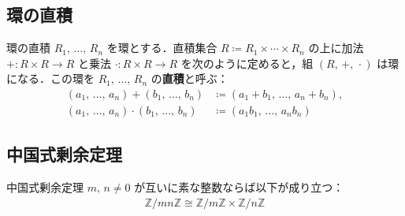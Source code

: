 \documentclass[geometry_main]{subfiles}
\begin{document}
\subsection{環の直積}

\begin{mydef}[label=def:prod-ring]{環の直積}
	$R_1,\, \dots ,\, R_n$ を環とする．直積集合 $R \coloneqq R_1 \times \cdots \times R_n$ の上に加法 $+ \colon R \times R \to R$ と乗法 $\cdot\mathrel{}\colon R\times R \to R$ を次のように定めると，組 $(R,\, +,\, \cdot\mathrel{})$ は環になる．この環を $R_1,\, \dots,\, R_n$ の\textbf{直積}と呼ぶ：
	\begin{align}
		(a_1,\, \dots ,\, a_n) + (b_1,\, \dots,\, b_n)& \coloneqq (a_1 + b_1 ,\, \dots ,\, a_n+b_n), \\
		(a_1,\, \dots ,\, a_n) \cdot (b_1,\, \dots,\, b_n)& \coloneqq (a_1b_1 ,\, \dots ,\, a_nb_n)
	\end{align}
\end{mydef}

\subsection{中国式剰余定理}

\begin{mytheo}[label=thm:ChineseRemainder]{中国式剰余定理}
	$m,\, n \neq 0$ が互いに素な整数ならば以下が成り立つ：
	\begin{align}
		\mathbb{Z}/mn\mathbb{Z} \cong \mathbb{Z}/m \mathbb{Z} \times \mathbb{Z}/n\mathbb{Z}
	\end{align}
\end{mytheo}
\end{document}
